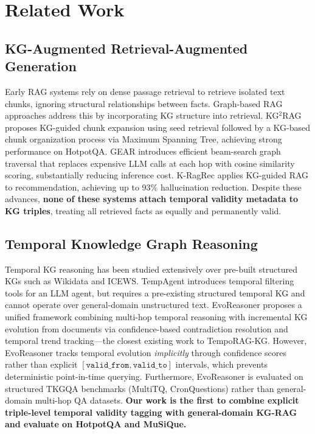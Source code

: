 \documentclass[11pt]{article}
\begin{document}
\section{Related Work}

\subsection{KG-Augmented Retrieval-Augmented Generation}

Early RAG systems \cite{lewis2020retrieval} rely on dense passage retrieval
to retrieve isolated text chunks, ignoring structural relationships between
facts. Graph-based RAG approaches address this by incorporating KG structure
into retrieval. KG$^2$RAG \cite{zhu2025kg2rag} proposes KG-guided chunk
expansion using seed retrieval followed by a KG-based chunk organization
process via Maximum Spanning Tree, achieving strong performance on
HotpotQA. GEAR \cite{ma2025gear} introduces efficient beam-search graph
traversal that replaces expensive LLM calls at each hop with cosine
similarity scoring, substantially reducing inference cost. K-RagRec
\cite{wang2025kragrec} applies KG-guided RAG to recommendation, achieving
up to 93\% hallucination reduction. Despite these advances,
\textbf{none of these systems attach temporal validity metadata to KG
triples}, treating all retrieved facts as equally and permanently valid.

\subsection{Temporal Knowledge Graph Reasoning}

Temporal KG reasoning has been studied extensively over pre-built structured
KGs such as Wikidata and ICEWS. TempAgent \cite{tempagent2025} introduces
temporal filtering tools for an LLM agent, but requires a pre-existing
structured temporal KG and cannot operate over general-domain unstructured
text. EvoReasoner \cite{evoreasonerevokg2025} proposes a unified framework
combining multi-hop temporal reasoning with incremental KG evolution from
documents via confidence-based contradiction resolution and temporal trend
tracking---the closest existing work to TempoRAG-KG. However, EvoReasoner
tracks temporal evolution \textit{implicitly} through confidence scores
rather than explicit $[\mathtt{valid\_from}, \mathtt{valid\_to}]$ intervals,
which prevents deterministic point-in-time querying. Furthermore,
EvoReasoner is evaluated on structured TKGQA benchmarks (MultiTQ,
CronQuestions) rather than general-domain multi-hop QA datasets.
\textbf{Our work is the first to combine explicit triple-level temporal
validity tagging with general-domain KG-RAG and evaluate on HotpotQA and
MuSiQue.}
\end{document}
